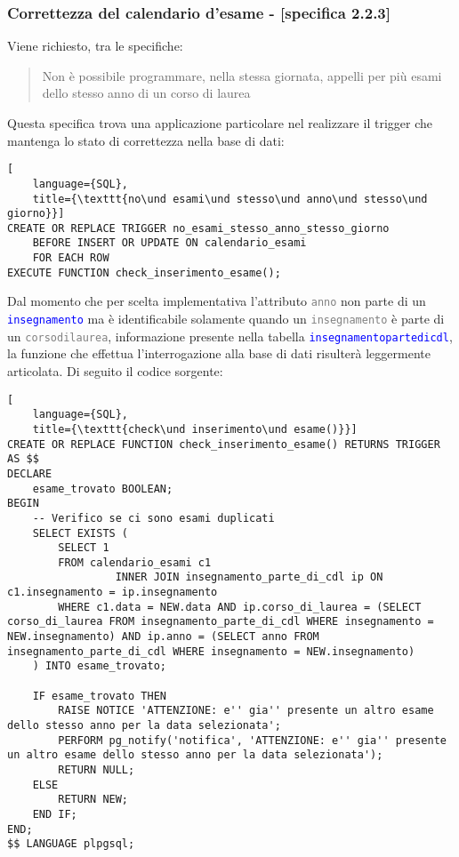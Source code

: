 \documentclass{article}
\newcommand{\tabb}[1]{\texttt{\textcolor{blue}{#1}}}
\newcommand{\attr}[1]{\texttt{\textcolor{gray}{#1}}}
\newcommand{\und}[0]{\textunderscore}
\begin{document}
\subsubsection{Correttezza del calendario d'esame - [specifica 2.2.3]}
Viene richiesto, tra le specifiche:
\begin{quote}
    Non è possibile programmare, nella stessa giornata, appelli per più esami dello stesso anno di un corso di laurea
\end{quote}
Questa specifica trova una applicazione particolare nel realizzare il trigger che mantenga lo stato di correttezza nella base di dati:
\begin{lstlisting}[
    language={SQL},
    title={\texttt{no\und esami\und stesso\und anno\und stesso\und giorno}}]
CREATE OR REPLACE TRIGGER no_esami_stesso_anno_stesso_giorno
    BEFORE INSERT OR UPDATE ON calendario_esami
    FOR EACH ROW
EXECUTE FUNCTION check_inserimento_esame();

\end{lstlisting}
Dal momento che per scelta implementativa l'attributo \attr{anno} non parte di un \tabb{insegnamento} ma è identificabile solamente quando un \attr{insegnamento} è parte di un \attr{corso\und di\und laurea}, informazione presente nella tabella \tabb{insegnamento\und parte\und di\und cdl}, la funzione che effettua l'interrogazione alla base di dati risulterà leggermente articolata. Di seguito il codice sorgente:
\begin{lstlisting}[
    language={SQL},
    title={\texttt{check\und inserimento\und esame()}}]
CREATE OR REPLACE FUNCTION check_inserimento_esame() RETURNS TRIGGER AS $$
DECLARE
    esame_trovato BOOLEAN;
BEGIN
    -- Verifico se ci sono esami duplicati
    SELECT EXISTS (
        SELECT 1
        FROM calendario_esami c1
                 INNER JOIN insegnamento_parte_di_cdl ip ON c1.insegnamento = ip.insegnamento
        WHERE c1.data = NEW.data AND ip.corso_di_laurea = (SELECT corso_di_laurea FROM insegnamento_parte_di_cdl WHERE insegnamento = NEW.insegnamento) AND ip.anno = (SELECT anno FROM insegnamento_parte_di_cdl WHERE insegnamento = NEW.insegnamento)
    ) INTO esame_trovato;

    IF esame_trovato THEN
        RAISE NOTICE 'ATTENZIONE: e'' gia'' presente un altro esame dello stesso anno per la data selezionata';
        PERFORM pg_notify('notifica', 'ATTENZIONE: e'' gia'' presente un altro esame dello stesso anno per la data selezionata');
        RETURN NULL;
    ELSE
        RETURN NEW;
    END IF;
END;
$$ LANGUAGE plpgsql;
\end{lstlisting}
\end{document}
